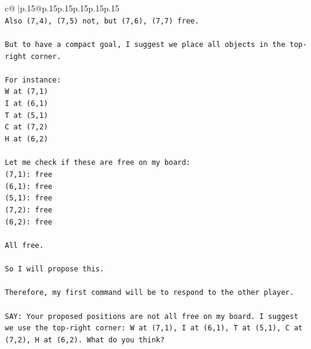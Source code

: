 \documentclass{article}
\begin{document}
{\begin{supertabular}{c@{$\;$}|p{.15\linewidth}@{}p{.15\linewidth}p{.15\linewidth}p{.15\linewidth}p{.15\linewidth}p{.15\linewidth}}
{{{\\ 
\texttt{Also (7,4), (7,5) not, but (7,6), (7,7) free.} \\
\\ 
\texttt{But to have a compact goal, I suggest we place all objects in the top{-}right corner.} \\
\\ 
\texttt{For instance:} \\
\texttt{W at (7,1)} \\
\texttt{I at (6,1)} \\
\texttt{T at (5,1)} \\
\texttt{C at (7,2)} \\
\texttt{H at (6,2)} \\
\\ 
\texttt{Let me check if these are free on my board:} \\
\texttt{(7,1): free} \\
\texttt{(6,1): free} \\
\texttt{(5,1): free} \\
\texttt{(7,2): free} \\
\texttt{(6,2): free} \\
\\ 
\texttt{All free.} \\
\\ 
\texttt{So I will propose this.} \\
\\ 
\texttt{Therefore, my first command will be to respond to the other player.} \\
\\ 
\texttt{SAY: Your proposed positions are not all free on my board. I suggest we use the top{-}right corner: W at (7,1), I at (6,1), T at (5,1), C at (7,2), H at (6,2). What do you think?} \\
            }
        }
    }
     \\ \\


\end{supertabular}}
\end{document}
